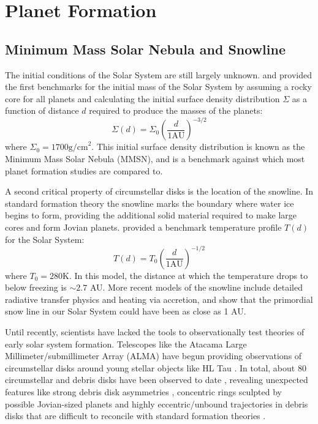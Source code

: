 \section{Planet Formation}
\label{sec:PF}
\subsection{Minimum Mass Solar Nebula and Snowline}
The initial conditions of the Solar System are still largely unknown.
\citet{Hayashi1981} and \citet{Weidenschilling1977} provided the first benchmarks for the initial mass of the Solar System by assuming a rocky core for all planets and calculating the initial surface density distribution $\Sigma$ as a function of distance $d$ required to produce the masses of the planets:
\begin{equation}
\Sigma(d) = \Sigma_0\left(\frac{d}{1 \textrm{AU}} \right)^{-3/2}
\end{equation}
where $\Sigma_0 = 1700 \textrm{g/cm}^{2}$. 
This initial surface density distribution is known as the Minimum Mass Solar Nebula (MMSN), and is a benchmark against which most planet formation studies are compared to.


A second critical property of circumstellar disks is the location of the snowline. 
In standard formation theory the snowline marks the boundary where water ice begins to form, providing the additional solid material required to make large cores and form Jovian planets.
\citet{Hayashi1981} provided a benchmark temperature profile $T(d)$ for the Solar System:
\begin{equation}
T(d) = T_0 \left(\frac{d}{1 \textrm{AU}} \right)^{-1/2}
\end{equation}
where $T_0 = 280$K. 
In this model, the distance at which the temperature drops to below freezing is $\sim 2.7$ AU. 
More recent models of the snowline \citep{Sasselov2000} include detailed radiative transfer physics and heating via accretion, and show that the primordial snow line in our Solar System could have been as close as 1 AU.

Until recently, scientists have lacked the tools to observationally test theories of early solar system formation.  
Telescopes like the Atacama Large Millimeter/submillimeter Array (ALMA) have begun providing observations of circumstellar disks around young stellar objects like HL Tau \citep{ALMA2015}.
In total, about 80 circumstellar and debris disks have been observed to date \citep[e.g.][]{Schneider2014,Choquet2016}, revealing unexpected features like strong debris disk asymmetries \citep{Hines2007}, concentric rings sculpted by possible Jovian-sized planets \citep{Tamayo2015} and highly eccentric/unbound trajectories in debris disks that are difficult to reconcile with standard formation theories \citep{Boccaletti2015}.

